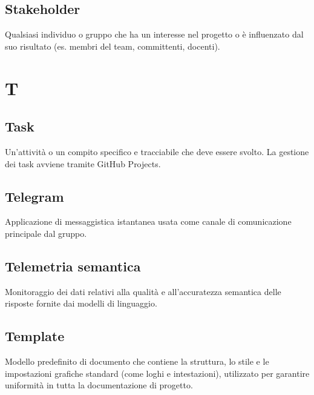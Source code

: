 \documentclass[a4paper, 11pt, oneside]{scrartcl} %
\begin{document}
\subsection*{Stakeholder}


Qualsiasi individuo o gruppo che ha un interesse nel progetto o è influenzato dal suo risultato (es. membri del team, committenti, docenti).

\vspace{0.5cm}


\section*{T}


\subsection*{Task}


Un'attività o un compito specifico e tracciabile che deve essere svolto. La gestione dei task avviene tramite GitHub Projects.

\vspace{0.5cm}

\subsection*{Telegram}


Applicazione di messaggistica istantanea usata come canale di comunicazione principale dal gruppo.

\vspace{0.5cm}

\subsection*{Telemetria semantica}
Monitoraggio dei dati relativi alla qualità e all'accuratezza semantica delle risposte fornite dai modelli di linguaggio.
\vspace{0.5cm}

\subsection*{Template}
Modello predefinito di documento che contiene la struttura, lo stile e le impostazioni grafiche standard (come loghi e intestazioni), utilizzato per garantire uniformità in tutta la documentazione di progetto.
\vspace{0.5cm}
\end{document}
